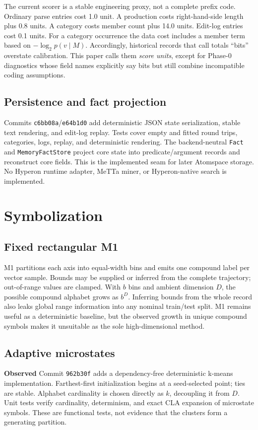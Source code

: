 \documentclass[11pt]{article}
\newcommand{\Observed}{\textbf{Observed}}
\begin{document}
The current scorer is a stable engineering proxy, not a complete prefix code. Ordinary parse entries cost 1.0 unit. A production costs right-hand-side length plus 0.8 units. A category costs member count plus 14.0 units. Edit-log entries cost 0.1 units. For a category occurrence the data cost includes a member term based on $-\log_2 p(v\mid M)$. Accordingly, historical records that call totals ``bits'' overstate calibration. This paper calls them \emph{score units}, except for Phase-0 diagnostics whose field names explicitly say bits but still combine incompatible coding assumptions.

\subsection{Persistence and fact projection}
Commits \texttt{c6bb08a}/\texttt{e64b1d0} add deterministic JSON state serialization, stable text rendering, and edit-log replay. Tests cover empty and fitted round trips, categories, logs, replay, and deterministic rendering. The backend-neutral \texttt{Fact} and \texttt{MemoryFactStore} project core state into predicate/argument records and reconstruct core fields. This is the implemented seam for later Atomspace storage. No Hyperon runtime adapter, MeTTa miner, or Hyperon-native search is implemented.

\section{Symbolization}
\subsection{Fixed rectangular M1}
M1 partitions each axis into equal-width bins and emits one compound label per vector sample. Bounds may be supplied or inferred from the complete trajectory; out-of-range values are clamped. With $b$ bins and ambient dimension $D$, the possible compound alphabet grows as $b^D$. Inferring bounds from the whole record also leaks global range information into any nominal train/test split. M1 remains useful as a deterministic baseline, but the observed growth in unique compound symbols makes it unsuitable as the sole high-dimensional method.

\subsection{Adaptive microstates}
\Observed{} Commit \texttt{962b30f} adds a dependency-free deterministic k-means implementation. Farthest-first initialization begins at a seed-selected point; ties are stable. Alphabet cardinality is chosen directly as $k$, decoupling it from $D$. Unit tests verify cardinality, determinism, and exact CLA expansion of microstate symbols. These are functional tests, not evidence that the clusters form a generating partition.
\end{document}
